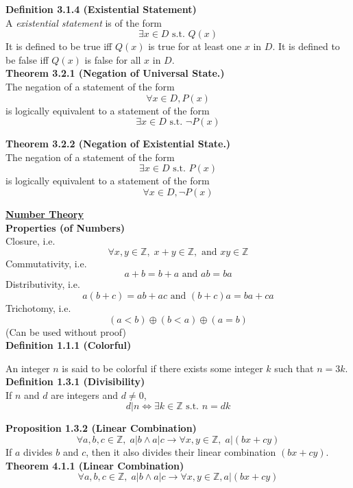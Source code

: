 \documentclass[a4paper]{article}
\newcommand{\heading}[1]{{\small\underline{\textbf{#1}}}}
\newcommand{\subheading}[1]{{\scriptsize\textbf{#1}}}
\begin{document}
\begin{multicols*}{4}
\subheading{Definition 3.1.4 (Existential Statement)}\\
A \textit{existential statement} is of the form $$\exists x \in D \text{ s.t. }
Q(x)$$ It is defined to be true iff $Q(x)$ is true for at least one $x$ in $D$.
It is defined to be false iff $Q(x)$ is false for all $x$ in $D$.\\

\subheading{Theorem 3.2.1 (Negation of Universal State.)}\\
The negation of a statement of the form $$\forall x \in D, P(x)$$ is logically
equivalent to a statement of the form $$\exists x \in D \text{ s.t. } \neg
P(x)$$

\subheading{Theorem 3.2.2 (Negation of Existential State.)}\\
The negation of a statement of the form $$\exists x \in D \text{ s.t. } P(x)$$
is logically equivalent to a statement of the form $$\forall x \in D, \neg
P(x)$$

\heading{Number Theory} \\

\subheading{Properties (of Numbers)} \\
Closure, i.e.
$$\forall x, y \in \mathbb{Z},\;
         x + y \in \mathbb{Z},\text{ and }
            xy \in \mathbb{Z}$$
Commutativity, i.e.
  $$a+b=b+a\text{ and }ab=ba$$
Distributivity, i.e.
  $$a(b+c) = ab + ac \text{ and } (b+c)a = ba + ca$$
Trichotomy, i.e.
  $$(a < b) \oplus (b < a) \oplus (a = b)$$
(Can be used without proof)\\

\subheading{Definition 1.1.1 (Colorful)}

An integer $n$ is said to be colorful if there exists some integer $k$ such
that $n = 3k$.\\

\subheading{Definition 1.3.1 (Divisibility)}\\
If $n$ and $d$ are integers and $d \neq 0$,
  $$ d|n \iff \exists k \in \mathbb{Z} \text{ s.t. } n=dk $$

\subheading{Proposition 1.3.2 (Linear Combination)}
$$\forall a, b, c \in \mathbb{Z},\;
    a | b \land a | c \rightarrow
    \forall x, y \in \mathbb{Z},\;
    a | (bx + cy)$$
If $a$ divides $b$ and $c$, then it also divides their linear combination
$(bx + cy)$.\\

\subheading{Theorem 4.1.1 (Linear Combination)}\\
$$\forall a,b,c \in \mathbb{Z},\;
  a | b \land a | c \rightarrow \forall x,y \in \mathbb{Z}, a | (bx + cy)$$


\end{multicols*}
\end{document}
